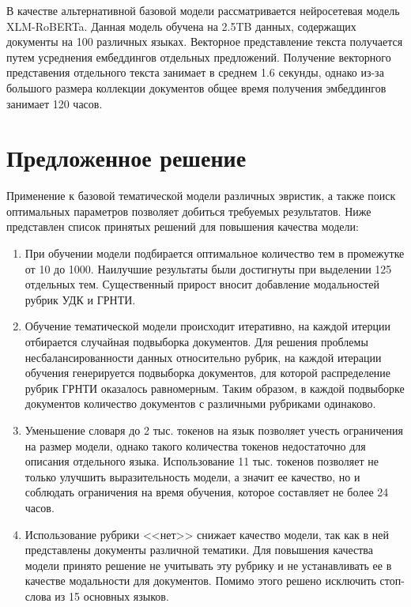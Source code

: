\documentclass[12pt, twoside]{article}
\begin{document}
В качестве альтернативной базовой модели рассматривается нейросетевая модель XLM-RoBERTa\cite{Roberta}. Данная модель обучена на 2.5TB данных, содержащих документы на 100 различных языках. Векторное представление текста получается путем усреднения ембеддингов отдельных предложений. Получение векторного представения отдельного текста занимает в среднем 1.6 секунды, однако из-за большого размера коллекции документов общее время получения эмбеддингов занимает 120 часов.

\section{Предложенное решение}

Применение к базовой тематической модели различных эвристик, а также поиск оптимальных параметров позволяет добиться требуемых результатов. Ниже представлен список принятых решений для повышения качества модели:

\begin{enumerate}

\item При обучении модели подбирается оптимальное количество тем в промежутке от 10 до 1000. Наилучшие результаты были достигнуты при выделении 125 отдельных тем. Существенный прирост вносит добавление модальностей рубрик УДК и ГРНТИ. 

\item Обучение тематической модели происходит итеративно, на каждой итерции отбирается случайная подвыборка документов. Для решения проблемы несбалансированности данных относительно рубрик, на каждой итерации обучения генерируется подвыборка документов, для которой распределение рубрик ГРНТИ оказалось равномерным. Таким образом, в каждой подвыборке документов количество документов с различными рубриками одинаково.

\item Уменьшение словаря до 2 тыс. токенов на язык позволяет учесть ограничения на размер модели, однако такого количества токенов недостаточно для описания отдельного языка. Использование 11 тыс. токенов позволяет не только улучшить выразительность модели, а значит ее качество, но и соблюдать ограничения на время обучения, которое составляет не более 24 часов.

\item Использование рубрики <<нет>> снижает качество модели, так как в ней представлены документы различной тематики. Для повышения качества модели принято решение не учитывать эту рубрику и не устанавливать ее в качестве модальности для документов. Помимо этого решено исключить стоп-слова из 15 основных языков.

\end{enumerate}
\end{document}
